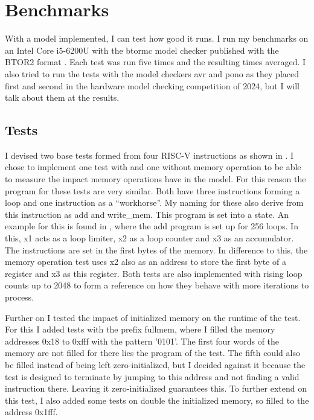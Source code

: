 \chapter{Benchmarks}\label{chap:benchmarks}
With a model implemented, I can test how good it runs. I run my
benchmarks on an Intel Core i5-6200U with the btormc model checker
published with the BTOR2 format \cite{btor2}. Each test was run five
times and the resulting times averaged. I also tried to run the tests
with the model checkers avr and pono  as they placed first
and second in the hardware model checking competition of 2024, but I
will talk about them at the results.

\section{Tests}
I devised two base tests formed from four RISC-V instructions as
shown in . I chose to implement one test
with and one without memory operation to be able to measure the
impact memory operations have in the model. For this reason the
program for these tests are very similar. Both have three
instructions forming a loop and one instruction as a
\enquote{workhorse}. My naming for these also derive from this
instruction as add and write\_mem. This program is set into a state.
An example for this is found in , where the
add program is set up for 256 loops. In this, x1 acts as a loop
limiter, x2 as a loop counter and x3 as an accumulator. The
instructions are set in the first bytes of the memory. In difference
to this, the memory operation test uses x2 also as an address to
store the first byte of a register and x3 as this register. Both
tests are also implemented with rising loop counts up to 2048 to form
a reference on how they behave with more iterations to process.




Further on I tested the impact of initialized memory on the runtime
of the test. For this I added tests with the prefix fullmem, where I
filled the memory addresses 0x18 to 0xfff with the pattern '0101'.
The first four words of the memory are not filled for there lies the
program of the test. The fifth could also be filled instead of being
left zero-initialized, but I decided against it because the test is
designed to terminate by jumping to this address and not finding a
valid instruction there. Leaving it zero-initialized guarantees this.
To further extend on this test, I also added some tests on double the
initialized memory, so filled to the address 0x1fff.

